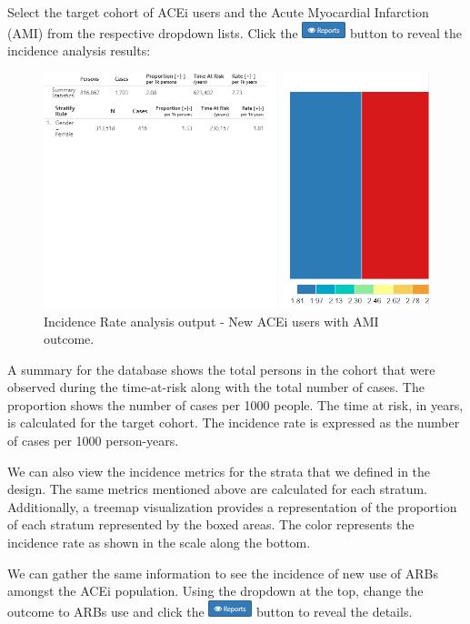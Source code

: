 \documentclass[11pt]{book}
\theoremstyle{definition}
\theoremstyle{definition}
\theoremstyle{definition}
\theoremstyle{remark}
\begin{document}
Select the target cohort of ACEi users and the Acute Myocardial Infarction (AMI) from the respective dropdown lists. Click the \includegraphics{images/Characterization/atlasIncidenceReportButton.png} button to reveal the incidence analysis results:

\begin{figure}

{\centering \includegraphics[width=1\linewidth]{images/Characterization/atlasIncidenceResults} 

}

\caption{Incidence Rate analysis output - New ACEi users with AMI outcome.}\label{fig:atlasIncidenceResults}
\end{figure}

A summary for the database shows the total persons in the cohort that were observed during the time-at-risk along with the total number of cases. The proportion shows the number of cases per 1000 people. The time at risk, in years, is calculated for the target cohort. The incidence rate is expressed as the number of cases per 1000 person-years.

We can also view the incidence metrics for the strata that we defined in the design. The same metrics mentioned above are calculated for each stratum. Additionally, a treemap visualization provides a representation of the proportion of each stratum represented by the boxed areas. The color represents the incidence rate as shown in the scale along the bottom.

We can gather the same information to see the incidence of new use of ARBs amongst the ACEi population. Using the dropdown at the top, change the outcome to ARBs use and click the \includegraphics{images/Characterization/atlasIncidenceReportButton.png} button to reveal the details.
\end{document}
